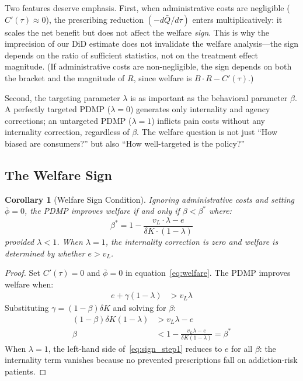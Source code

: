 \documentclass[12pt]{article}
\newtheorem{corollary}{Corollary}
\begin{document}
Two features deserve emphasis. First, when administrative costs are negligible ($C'(\tau) \approx 0$), the prescribing reduction $(-d\bar{Q}/d\tau)$ enters multiplicatively: it scales the net benefit but does not affect the welfare \textit{sign}. This is why the imprecision of our DiD estimate does not invalidate the welfare analysis---the sign depends on the ratio of sufficient statistics, not on the treatment effect magnitude. (If administrative costs are non-negligible, the sign depends on both the bracket and the magnitude of $R$, since welfare is $B \cdot R - C'(\tau)$.)

Second, the targeting parameter $\lambda$ is as important as the behavioral parameter $\beta$. A perfectly targeted PDMP ($\lambda = 0$) generates only internality and agency corrections; an untargeted PDMP ($\lambda = 1$) inflicts pain costs without any internality correction, regardless of $\beta$. The welfare question is not just ``How biased are consumers?'' but also ``How well-targeted is the policy?''

\subsection{The Welfare Sign}\label{sec:framework_sign}

\begin{corollary}[Welfare Sign Condition]\label{cor:sign}
Ignoring administrative costs and setting $\bar{\phi} = 0$, the PDMP improves welfare if and only if $\beta < \beta^*$ where:
\begin{equation}\label{eq:betastar}
\beta^* = 1 - \frac{v_L \cdot \lambda - e}{\delta K \cdot (1-\lambda)}
\end{equation}
provided $\lambda < 1$. When $\lambda = 1$, the internality correction is zero and welfare is determined by whether $e > v_L$.
\end{corollary}

\begin{proof}
Set $C'(\tau) = 0$ and $\bar{\phi} = 0$ in equation~\eqref{eq:welfare}. The PDMP improves welfare when:
\begin{align}
e + \gamma(1-\lambda) &> v_L \lambda \label{eq:sign_step1}
\end{align}
Substituting $\gamma = (1-\beta)\delta K$ and solving for $\beta$:
\begin{align}
(1 - \beta)\delta K (1-\lambda) &> v_L \lambda - e \nonumber \\
\beta &< 1 - \frac{v_L \lambda - e}{\delta K(1-\lambda)} = \beta^* \label{eq:betastar_deriv}
\end{align}
When $\lambda = 1$, the left-hand side of~\eqref{eq:sign_step1} reduces to $e$ for all $\beta$: the internality term vanishes because no prevented prescriptions fall on addiction-risk patients. \qedhere
\end{proof}
\end{document}
